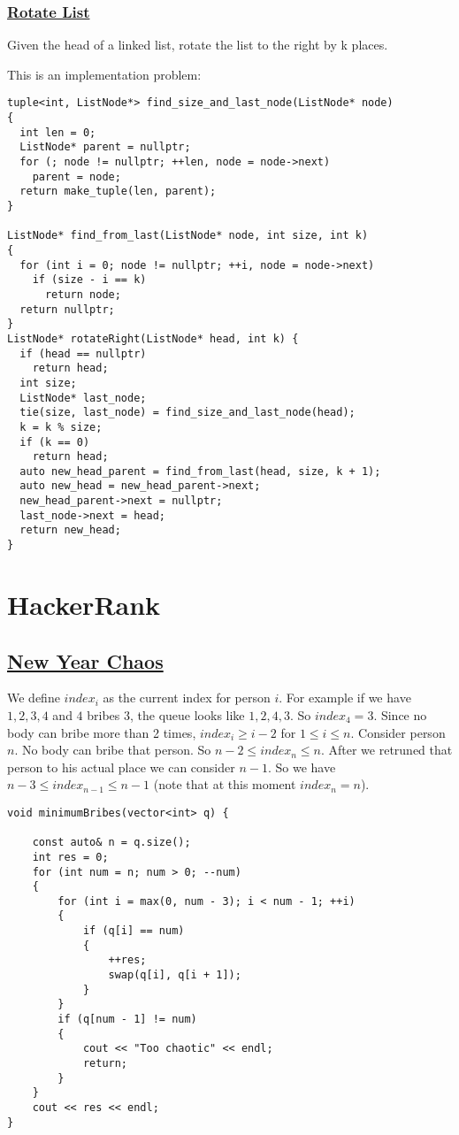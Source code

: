 \documentclass{book}
\begin{document}
	\subsection{\href{https://leetcode.com/problems/rotate-list/}{Rotate List}}
	Given the head of a linked list, rotate the list to the right by k places.
	\par This is an implementation problem:
	\begin{lstlisting}
tuple<int, ListNode*> find_size_and_last_node(ListNode* node)
{
  int len = 0;
  ListNode* parent = nullptr;
  for (; node != nullptr; ++len, node = node->next)
    parent = node;
  return make_tuple(len, parent);
}

ListNode* find_from_last(ListNode* node, int size, int k)
{
  for (int i = 0; node != nullptr; ++i, node = node->next)
    if (size - i == k)
      return node;
  return nullptr;
}
ListNode* rotateRight(ListNode* head, int k) {
  if (head == nullptr)
    return head;
  int size;
  ListNode* last_node;
  tie(size, last_node) = find_size_and_last_node(head);
  k = k % size;
  if (k == 0)
    return head;
  auto new_head_parent = find_from_last(head, size, k + 1);
  auto new_head = new_head_parent->next;
  new_head_parent->next = nullptr;
  last_node->next = head;
  return new_head;
}
	\end{lstlisting}
	\chapter{HackerRank}
	\section{\href{https://www.hackerrank.com/challenges/new-year-chaos/problem}{New Year Chaos}}
	 We define $index_i$ as the current index for person $i$. For example if we have $1, 2, 3, 4$ and $4$ bribes $3$, the queue looks like $1, 2, 4, 3$. So $index_4 = 3$. Since no body can bribe more than 2 times, $index_i \ge i - 2$ for $1 \le i \le n$. Consider person $n$. No body can bribe that person. So $n - 2 \le index_n \le n$. After we retruned that person to his actual place we can consider $n - 1$. So we have $n - 3 \le index_{n - 1} \le n - 1$ (note that at this moment $index_n = n$).
	 \begin{lstlisting}
void minimumBribes(vector<int> q) {

    const auto& n = q.size();
    int res = 0;
    for (int num = n; num > 0; --num)
    {
        for (int i = max(0, num - 3); i < num - 1; ++i)
        {
            if (q[i] == num)
            {
                ++res;
                swap(q[i], q[i + 1]);
            }
        }
        if (q[num - 1] != num)
        {
            cout << "Too chaotic" << endl;
            return;
        }
    }
    cout << res << endl;
}
	 \end{lstlisting}
	 
\end{document}
